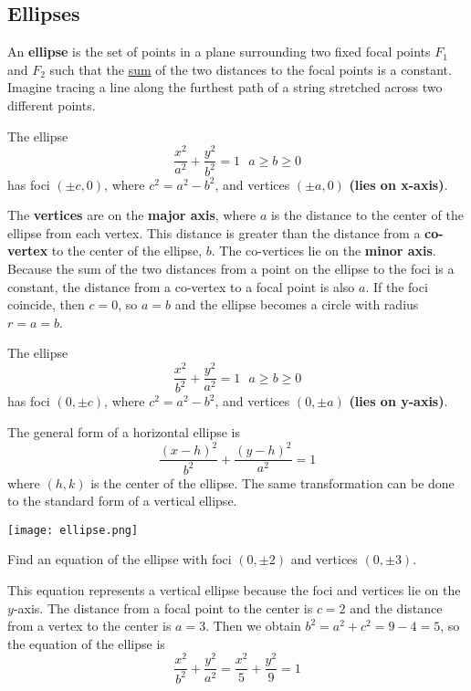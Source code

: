   \subsection*{Ellipses}
    An \textbf{ellipse} is the set of points in a plane surrounding two fixed focal points $F_1$ and $F_2$ such that the \underline{sum} of the two distances to the focal points is a constant. Imagine tracing a line along the furthest path of a string stretched across two different points.
    \begin{definition}
      The ellipse $$\frac{x^2}{a^2}+\frac{y^2}{b^2}=1 \ \ \ a \geq b \geq 0$$ has foci $(\pm c,0)$, where $c^2=a^2 - b^2$, and vertices $(\pm a,0)$ \textbf{(lies on x-axis)}.
    \end{definition}
    The \textbf{vertices} are on the \textbf{major axis}, where $a$ is the distance to the center of the ellipse from each vertex. This distance is greater than the distance from a \textbf{co-vertex} to the center of the ellipse, $b$. The co-vertices lie on the \textbf{minor axis}. Because the sum of the two distances from a point on the ellipse to the foci is a constant, the distance from a co-vertex to a focal point is also $a$. If the foci coincide, then $c=0$, so $a=b$ and the ellipse becomes a circle with radius $r=a=b$.
    \begin{definition}
      The ellipse $$\frac{x^2}{b^2}+\frac{y^2}{a^2}=1 \ \ \ a \geq b \geq 0$$ has foci $(0, \pm c)$, where $c^2=a^2 - b^2$, and vertices $(0, \pm a)$ \textbf{(lies on y-axis)}.
    \end{definition}
    \begin{definition}
      The general form of a horizontal ellipse is
      $$\frac{(x-h)^2}{b^2}+\frac{(y-h)^2}{a^2}=1$$
      where $(h,k)$ is the center of the ellipse. The same transformation can be done to the standard form of a vertical ellipse.
    \end{definition}
    \begin{center}
      \texttt{[image: ellipse.png]}
    \end{center}
    \begin{example}
      Find an equation of the ellipse with foci $(0,\pm 2)$ and vertices $(0, \pm 3)$.
    \end{example}
    \begin{solution}
      This equation represents a vertical ellipse because the foci and vertices lie on the $y$-axis. The distance from a focal point to the center is $c=2$ and the distance from a vertex to the center is $a=3$. Then we obtain $b^2=a^2 + c^2=9-4=5$, so the equation of the ellipse is
      $$\frac{x^2}{b^2}+\frac{y^2}{a^2}=\frac{x^2}{5}+\frac{y^2}{9}=1$$
    \end{solution}
